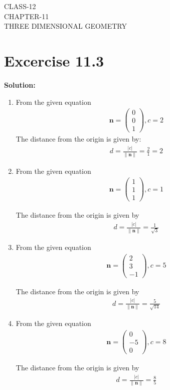 \documentclass[12pt]{article}
\providecommand{\norm}[1]{\left\lVert#1\right\rVert}
\newcommand{\solution}{\noindent \textbf{Solution: }}
\newcommand{\myvec}[1]{\ensuremath{\begin{pmatrix}#1\end{pmatrix}}}
\let\vec\mathbf
\begin{document}
\begin{center}
\textbf\large{CLASS-12 \\ CHAPTER-11 \\ THREE DIMENSIONAL GEOMETRY}
\end{center}
\section*{Excercise 11.3}

\solution
\fi
\begin{enumerate}
\item From the given equation
	\begin{align}
		\vec{n}=\myvec{0\\0\\1},c=2
	\end{align}
	The distance from the origin is given by:
		\begin{align}
			d=\frac{|c|}{\norm{\vec{n}}}=\frac{2}{1}=2
		\end{align}

\item From the given equation
         \begin{align}
		\vec{n}=\myvec{1\\1\\1},c=1
			\end{align}
	 
	The distance from the origin is given by
		\begin{align}
			d=\frac{|c|}{\norm{\vec{n}}}=\frac{1}{\sqrt{3}}
		\end{align}

\item From the given equation
         \begin{align}
		\vec{n}=\myvec{2\\3\\-1},c=5
			\end{align}
	
	The distance from the origin is given by
		\begin{align}
			d=\frac{|c|}{\norm{\vec{n}}}=\frac{5}{\sqrt{14}}
		\end{align}
		
\item From the given equation
         \begin{align}
		\vec{n}=\myvec{0\\-5\\0},c=8
			\end{align}
	
	The distance from the origin is given by
		\begin{align}
			d=\frac{|c|}{\norm{\vec{n}}}=\frac{8}{5}
		\end{align}

\end{enumerate}
 
\end{document}
